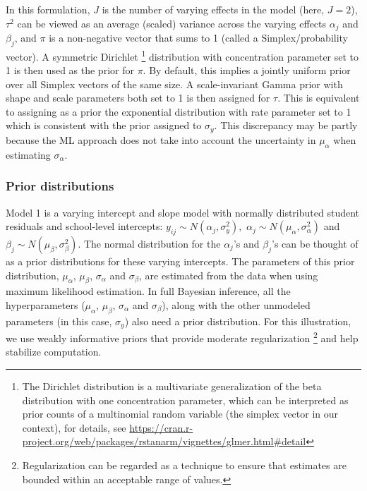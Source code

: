 In this formulation, $J$ is the number of varying effects in the model (here, $J=2$), $\tau^2$ can be viewed as an average (scaled) variance across the varying effects $\alpha_j$ and $\beta_j$, and $\pi$ is a non-negative vector that sums to 1 (called a Simplex/probability vector).  A symmetric Dirichlet \footnote{The Dirichlet distribution is a multivariate generalization of the beta distribution with one concentration parameter, which can be interpreted as prior counts of a multinomial random variable (the simplex vector in our context), for details, see \url{https://cran.r-project.org/web/packages/rstanarm/vignettes/glmer.html\#detail}} distribution with concentration parameter set to 1 is then used as the prior for $\pi$.  By default, this implies a jointly uniform prior over all Simplex vectors of the same size.  A scale-invariant Gamma prior with shape and scale parameters both set to 1 is then assigned for $\tau$.  This is equivalent to assigning as a prior the exponential distribution with rate parameter set to 1 which is consistent with the prior assigned to $\sigma_y$. 
This discrepancy may be partly because the ML approach does not take into account the uncertainty in $\mu_{\alpha}$ when estimating $\sigma_{\alpha}$.

\subsubsection*{Prior distributions}
Model 1 is a varying intercept and slope model with normally distributed student residuals and school-level intercepts: $y_{ij} \sim N(\alpha_{j}, \sigma_{y}^{2}),$ $\alpha_{j}\sim N(\mu_{\alpha}, \sigma_{\alpha}^{2})$ and $\beta_{j}\sim N(\mu_{\beta}, \sigma_{\beta}^{2})$. The normal distribution for the $\alpha_{j}$'s and $\beta_{j}$'s can be thought of as a prior distributions for these varying intercepts. The parameters of this prior distribution, $\mu_{\alpha}$, $\mu_{\beta}$, $\sigma_{\alpha}$ and $\sigma_{\beta}$, are estimated from the data when using maximum likelihood estimation. In full Bayesian inference, all the hyperparameters ($\mu_{\alpha}$, $\mu_{\beta}$, $\sigma_{\alpha}$ and $\sigma_{\beta}$), along with the other unmodeled parameters (in this case, $\sigma_{y}$) also need a prior distribution. For this illustration, we use weakly informative priors that provide moderate regularization \footnote{Regularization can be regarded as a technique to ensure that estimates are bounded within an acceptable range of values.} and help stabilize computation.

